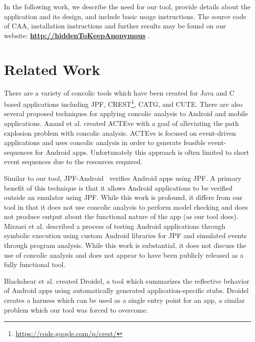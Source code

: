 \documentclass{sig-alternate}
\newif\ifisnopii
\begin{document}
In the following work, we describe the need for our tool, provide details about the application and its design, and include basic usage instructions. The source code of CAA, installation instructions and further results may be found on our website: \textbf{\ifisnopii \url{http://darwin.rit.edu/caa/} \else \url{http://hiddenToKeepAnonymous} \fi}.



\section{Related Work}
\label{sec: relatedwork}
There are a variety of concolic tools which have been created for Java and C based applications including JPF, CREST\footnote{\url{https://code.google.com/p/crest/}}, CATG, and CUTE\cite{Sen:2005:CCU:1081706.1081750}. There are also several proposed techniques for applying concolic analysis to Android and mobile applications. Anand et al.\cite{Anand:2012:ACT:2393596.2393666} created ACTEve with a goal of alleviating the path explosion problem with concolic analysis. ACTEve is focused on event-driven applications and uses concolic analysis in order to generate feasible event-sequences for Android apps. Unfortunately this approach is often limited to short event sequences due to the resources required.

Similar to our tool, JPF-Android~\cite{vanderMerwe:2014:EPS:2557833.2560576} verifies Android apps using JPF. A primary benefit of this technique is that it allows Android applications to be verified outside an emulator using JPF. While this work is profound, it differs from our tool in that it does not use concolic analysis to perform model checking and does not produce output about the functional nature of the app (as our tool does). Mirzaei et al.\cite{Mirzaei:2012:TAA:2382756.2382798} described a process of testing Android applications through symbolic execution using custom Android libraries for JPF and simulated events through program analysis. While this work is substantial, it does not discuss the use of concolic analysis and does not appear to have been publicly released as a fully functional tool.

Blackshear et al.\cite{Blackshear:2015:DGA:2771284.2771288} created Droidel, a tool which summarizes the reflective behavior of Android apps using automatically generated application-specific stubs. Droidel creates a harness which can be used as a single entry point for an app, a similar problem which our tool was forced to overcome. %
\end{document}
